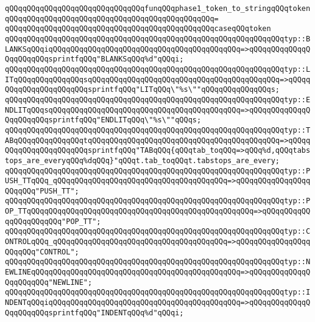 \newline
\newline
\newline
\verb|qQQqqQQqqQQqqQQqqQQqqQQqqQQqqQQqfunqQQqphase1_token_to_stringqQQqtoken|\newline
\verb|qQQqqQQqqQQqqQQqqQQqqQQqqQQqqQQqqQQqqQQqqQQqqQQq=|\newline
\verb|qQQqqQQqqQQqqQQqqQQqqQQqqQQqqQQqqQQqqQQqqQQqqQQqcaseqQQqtoken|\newline
\verb|qQQqqQQqqQQqqQQqqQQqqQQqqQQqqQQqqQQqqQQqqQQqqQQqqQQqqQQqqQQqqQQqtyp::BLANKSqQQqiqQQqqQQqqQQqqQQqqQQqqQQqqQQqqQQqqQQqqQQqqQQq=>qQQqqQQqqQQqqQQqqQQqqQQqsprintfqQQq"BLANKSqQQq%d"qQQqi;|\newline
\verb|qQQqqQQqqQQqqQQqqQQqqQQqqQQqqQQqqQQqqQQqqQQqqQQqqQQqqQQqqQQqqQQqtyp::LITqQQqqQQqqQQqqQQqsqQQqqQQqqQQqqQQqqQQqqQQqqQQqqQQqqQQqqQQqqQQq=>qQQqqQQqqQQqqQQqqQQqqQQqsprintfqQQq"LITqQQq\"%s\""qQQqqQQqqQQqqQQqs;|\newline
\verb|qQQqqQQqqQQqqQQqqQQqqQQqqQQqqQQqqQQqqQQqqQQqqQQqqQQqqQQqqQQqqQQqtyp::ENDLITqQQqsqQQqqQQqqQQqqQQqqQQqqQQqqQQqqQQqqQQqqQQqqQQq=>qQQqqQQqqQQqqQQqqQQqqQQqsprintfqQQq"ENDLITqQQq\"%s\""qQQqs;|\newline
\verb|qQQqqQQqqQQqqQQqqQQqqQQqqQQqqQQqqQQqqQQqqQQqqQQqqQQqqQQqqQQqqQQqtyp::TABqQQqqQQqqQQqqQQqtqQQqqQQqqQQqqQQqqQQqqQQqqQQqqQQqqQQqqQQqqQQq=>qQQqqQQqqQQqqQQqqQQqqQQqsprintfqQQq"TABqQQq{qQQqtab_toqQQq=>qQQq%d,qQQqtabstops_are_everyqQQq%dqQQq}"qQQqt.tab_toqQQqt.tabstops_are_every;|\newline
\verb|qQQqqQQqqQQqqQQqqQQqqQQqqQQqqQQqqQQqqQQqqQQqqQQqqQQqqQQqqQQqqQQqtyp::PUSH_TTqQQq_qQQqqQQqqQQqqQQqqQQqqQQqqQQqqQQqqQQqqQQq=>qQQqqQQqqQQqqQQqqQQqqQQq"PUSH_TT";|\newline
\verb|qQQqqQQqqQQqqQQqqQQqqQQqqQQqqQQqqQQqqQQqqQQqqQQqqQQqqQQqqQQqqQQqtyp::POP_TTqQQqqQQqqQQqqQQqqQQqqQQqqQQqqQQqqQQqqQQqqQQqqQQqqQQq=>qQQqqQQqqQQqqQQqqQQqqQQq"POP_TT";|\newline
\verb|qQQqqQQqqQQqqQQqqQQqqQQqqQQqqQQqqQQqqQQqqQQqqQQqqQQqqQQqqQQqqQQqtyp::CONTROLqQQq_qQQqqQQqqQQqqQQqqQQqqQQqqQQqqQQqqQQqqQQq=>qQQqqQQqqQQqqQQqqQQqqQQq"CONTROL";|\newline
\verb|qQQqqQQqqQQqqQQqqQQqqQQqqQQqqQQqqQQqqQQqqQQqqQQqqQQqqQQqqQQqqQQqtyp::NEWLINEqQQqqQQqqQQqqQQqqQQqqQQqqQQqqQQqqQQqqQQqqQQqqQQq=>qQQqqQQqqQQqqQQqqQQqqQQq"NEWLINE";|\newline
\verb|qQQqqQQqqQQqqQQqqQQqqQQqqQQqqQQqqQQqqQQqqQQqqQQqqQQqqQQqqQQqqQQqtyp::INDENTqQQqiqQQqqQQqqQQqqQQqqQQqqQQqqQQqqQQqqQQqqQQqqQQq=>qQQqqQQqqQQqqQQqqQQqqQQqsprintfqQQq"INDENTqQQq%d"qQQqi;|\newline
